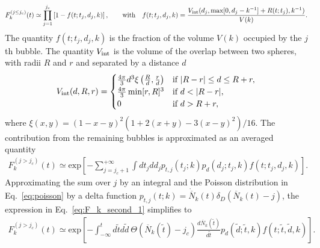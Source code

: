 \documentclass[twocolumn,superscriptaddress,aps,preprintnumbers,amsmath,amssymb,prl,footinbib]{revtex4-2}
\begin{document}
\begin{equation} \label{eq:Fk_first}
F_k^{(j\leq j_c)}(t) \simeq \prod_{j=1}^{j_c} \left[1-f(t;t_j,d_j,k)\right] ,\qquad \textrm{with} \quad f(t;t_j,d_j,k) = \frac{V_{\rm int}(d_j,\max[0,d_j-k^{-1}]+R(t;t_j),k^{-1})}{V(k)}.
\end{equation}
The quantity $f(t;t_j,d_j,k)$ is the fraction of the volume $V(k)$ occupied by the $j$th bubble.
The quantity $V_{\rm int}$ is the volume of the overlap between two spheres, with radii $R$ and $r$ and separated by a distance $d$~\cite{Lewicki:2024ghw}
\begin{equation}
V_{\rm int}(d,R,r) =
\begin{cases}
\frac{4\pi}{3} d^3 \xi\left(\frac{R}{d},\frac{r}{d}\right) & \text{if } |R-r| \leq d \leq R+r, \\
\frac{4\pi}{3} \min[r,R]^3 & \text{if } d < |R-r|, \\
0 & \text{if } d > R+r,
\end{cases}
\end{equation}
where $\xi(x,y)=(1-x-y)^2(1+2(x+y)-3(x-y)^2)/16$.
The contribution from the remaining bubbles is approximated as an averaged quantity~\cite{Lewicki:2024ghw}
\begin{align}
\label{eq:F_k_second_1}
F_k^{(j> j_c)}(t) \simeq \textrm{exp}\left[-\sum^{+\infty}_{j=j_c+1}\int dt_jdd_j p_{t,j}(t_j;k)p_d(d_j;t_j,k)f(t;t_j,d_j,k) \right].
\end{align}
Approximating the sum over $j$ by an integral and the Poisson distribution in Eq.~\eqref{eq:poisson} by a delta function $p_{t,j}(t;k)=\dot{\overline{N}}_k(t)\delta_{D}\left(\overline{N}_k(t)-j\right)$, the expression in Eq.~\eqref{eq:F_k_second_1} simplifies to~\cite{Lewicki:2024ghw}
\begin{align}
\label{eq:F_k_second_2}
F_k^{(j> j_c)}(t)\simeq \textrm{exp}\left[-\int_{-\infty}^t d\tilde{t}d\tilde{d} ~\Theta\left(\overline{N}_k(\tilde{t})-j_c\right)\frac{d\overline{N}_k(\tilde{t})}{d\tilde{t}}p_d(\tilde{d};\tilde{t},k)f(t;\tilde{t},\tilde{d},k) \right].
\end{align}
\end{document}
